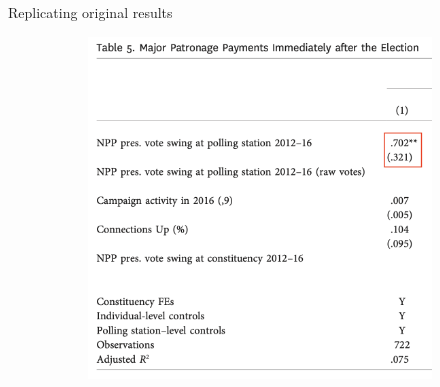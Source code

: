 \documentclass[10pt,table,aspectratio=169]{beamer}
\begin{document}
\begin{frame}[plain, label = two_dimensions]{Replicating original results}
\begin{figure}[H]
    \centering
    \begin{subfigure}{0.4\textwidth}
        \centering
        \includegraphics[width=\linewidth]{figures/observational_replication_t5.png}
    \end{subfigure}
    \hfill
    \begin{subfigure}{0.2\textwidth}
        \centering

\end{subfigure}
\end{figure}
\end{frame}
\end{document}
